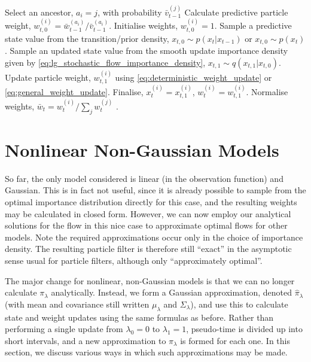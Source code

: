 \documentclass[a4paper,10pt]{article}
\newcommand{\rt}{t}                             %
\newcommand{\pt}{\lambda}                       %
\newcommand{\ls}[1]{x_{#1}}                     %
\newcommand{\pss}[2][]{^{(#2)#1}}               %
\newcommand{\pw}[1]{w_{#1}}                     %
\newcommand{\npw}[1]{\bar{w}_{#1}}              %
\newcommand{\naw}[1]{\bar{v}_{#1}}              %
\newcommand{\impden}{q}                         %
\newcommand{\oiden}[1]{\pi_{#1}}                %
\newcommand{\approxoiden}[1]{\hat{\pi}_{#1}}    %
\newcommand{\ess}[1]{N_{E,#1}}                  %
\newcommand{\lgoimean}[1]{\mu_{#1}}             %
\newcommand{\lgoicov}[1]{\Sigma_{#1}}           %
\begin{document}
\begin{algorithm} \label{alg:lg_SUPF}
\begin{algorithmic}[1]
      \IF{$t>1$ and $\ess{\rt-1}$ less than threshold}
        \STATE Select an ancestor, $a_i=j$, with probability $\naw{\rt-1}\pss{j}$
        \STATE Calculate predictive particle weight, $\pw{\rt,0}\pss{i} = \npw{\rt-1}\pss{a_i} / \naw{\rt-1}\pss{a_i}$.
      \ELSE
        \STATE Initialise weights, $\pw{\rt,0}\pss{i} = 1$.
      \ENDIF
      \STATE Sample a predictive state value from the transition/prior density, $\ls{\rt,0} \sim p(\ls{\rt} | \ls{\rt-1})$ or $\ls{\rt,0} \sim p(\ls{\rt})$.
      \STATE Sample an updated state value from the smooth update importance density given by \eqref{eq:lg_stochastic_flow_importance_density}, $\ls{\rt,1} \sim \impden(\ls{\rt,1} | \ls{\rt,0})$.
      \STATE Update particle weight, $\pw{\rt,1}\pss{i}$ using \eqref{eq:deterministic_weight_update} or \eqref{eq:general_weight_update}.
      \STATE Finalise, $\ls{\rt}\pss{i} = \ls{\rt,1}\pss{i}$, $\pw{\rt}\pss{i} = \pw{\rt,1}\pss{i}$.
    \ENDFOR
    \STATE Normalise weights, $\npw{\rt} = \pw{\rt}\pss{i} / \sum_j \pw{\rt}\pss{j}$ .
  \ENDFOR
\end{algorithmic}
\end{algorithm}



\section{Nonlinear Non-Gaussian Models}

So far, the only model considered is linear (in the observation function) and Gaussian. This is in fact not useful, since it is already possible to sample from the optimal importance distribution directly for this case, and the resulting weights may be calculated in closed form. However, we can now employ our analytical solutions for the flow in this nice case to approximate optimal flows for other models. Note the required approximations occur only in the choice of importance density. The resulting particle filter is therefore still ``exact'' in the asymptotic sense usual for particle filters, although only ``approximately optimal''.

The major change for nonlinear, non-Gaussian models is that we can no longer calculate $\oiden{\pt}$ analytically. Instead, we form a Gaussian approximation, denoted $\approxoiden{\pt}$ (with mean and covariance still written $\lgoimean{\pt}$ and $\lgoicov{\pt}$), and use this to calculate state and weight updates using the same formulas as before. Rather than performing a single update from $\pt_0=0$ to $\pt_1=1$, pseudo-time is divided up into short intervals, and a new approximation to $\oiden{\pt}$ is formed for each one. In this section, we discuss various ways in which such approximations may be made.
\end{document}
